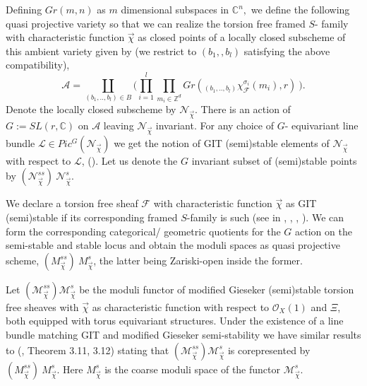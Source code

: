 \documentclass[10pt]{amsart}
\newcommand{\sO}{{\mathcal O}}
\numberwithin{equation}{subsection}
\begin{document}
Defining $Gr(m,n)$ as $m$ dimensional subspaces in $\mathbb C^{n},$ we define the following quasi projective variety so that we can realize the torsion free framed $S$- family with characteristic function $\vec\chi$ as closed points of a locally closed subscheme of this ambient variety given by (we restrict to $(b_1,,b_l)$ satisfying the above compatibility),
$$\mathscr{A}=\coprod\limits_{(b_1,..,b_l)\in B}\big (\prod\limits_{i=1}^{l}\prod\limits_{m_i\in \mathbb{Z}^d} Gr(_{(b_1,..,b_l)}\chi^{\sigma_{i}}_{\mathscr{F}}(m_i),r)\ \big).$$ Denote the locally closed subscheme by $\mathscr{N}_{\vec \chi}.$ There is an action of $G:=SL(r,\mathbb C)$ on $\mathscr{A}$ leaving $\mathscr{N}_{\vec\chi}$ invariant. For any choice of $G$- equivariant line bundle $\mathscr{L}\in Pic^{G}(\mathscr{N}_{\vec\chi})$ we get the notion of GIT (semi)stable elements of $\mathscr{N}_{\vec\chi}$ with respect to $\mathscr{L}$, (\cite{Dol}). Let us denote the $G$ invariant subset of (semi)stable points by $(\mathscr{N}^{ss}_{\vec\chi})
\ \mathscr{N}^{s}_{\vec\chi}.$\\\par
We declare a torsion free sheaf $\mathscr{F}$ with characteristic function $\vec\chi$ as GIT (semi)stable if its corresponding framed $S$-family is such (see in \cite{Koo1}, \cite{Koo2}, \cite{Koo3}, \cite{WW}). We can form the corresponding categorical/ geometric quotients for the $G$ action on the semi-stable and stable locus and obtain the moduli spaces as quasi projective scheme, $(M^{ss}_{\vec\chi})\ M^{s}_{\vec\chi}$, the latter being Zariski-open inside the former.\par
Let $(\mathscr{M}^{ss}_{\vec\chi})\mathscr{M}^{s}_{\vec\chi}$ be the moduli functor of modified Gieseker (semi)stable torsion free sheaves with $\vec\chi$ as characteristic function with respect to $\sO_{X}(1)$ and $\Xi$, both equipped with torus equivariant structures. Under the existence of a line bundle matching GIT and modified Gieseker semi-stability we have similar results to (\cite{Koo2}, Theorem 3.11, 3.12)
stating that $(\mathscr{M}^{ss}_{\vec\chi})\mathscr{M}^{s}_{\vec\chi}$ is corepresented by $(M^{ss}_{\vec\chi})\ M^{s}_{\vec\chi}.$ Here $M^{s}_{\vec\chi}$ is the coarse moduli space of the functor $\mathscr{M}^s_{\vec\chi}$.\\
\end{document}
